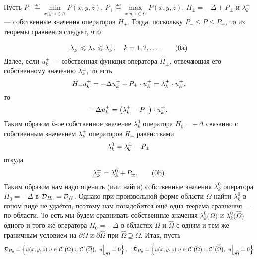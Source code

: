 Пусть $\displaystyle P_{-}\eqdef\min\limits_{x,y,z\in\overline{\Omega}}P(x,y,z)$, $\displaystyle P_{+}\eqdef\max\limits_{x,y,z\in\overline{\Omega}}P(x,y,z)$, $\displaystyle H_{\pm}=-\Delta+ P_{\pm}$  и $\lambda_k^{\pm}$ --- собственные значения операторов $H_{\pm}$. Тогда, поскольку $P_{-}\leqslant P\leqslant P_{+}$, то из теоремы сравнения следует, что%
\addtocounter{equation}{1} 
\begin{equation}\label{l10:eq:12a}
	\hfill\lambda_k^{-}\leqslant\lambda_k\leqslant\lambda_k^{+},\quad k=1,2,\ldots.\tag{\theequation a}\hfill
\end{equation} 
Далее, если $u_k^{\pm}$ --- собственная функция оператора $H_{\pm}$, отвечающая его собственному значению $\lambda_k^{\pm}$, то есть
\begin{equation*}
	\hfill H_{\pm}u_k^{\pm}=-\Delta u_k^{\pm}+P_{\pm}\cdot u_k^{\pm}=\lambda_k^{\pm}\cdot u_k^{\pm},\hfill
\end{equation*}
то
\begin{equation*}
	\hfill-\Delta u_k^{\pm}=\left(\lambda_k^{\pm}-P_{\pm}\right)\cdot u_k^{\pm}.\hfill
\end{equation*}
Таким образом $k$-ое собственное значение $\lambda_k^0$ оператора $H_0=-\Delta$ связанно с собственным значением $\lambda_k^{\pm}$ операторов $H_{\pm}$ равенствами
\begin{equation*}
	\hfill\lambda_k^0=\lambda_k^{\pm}-P_{\pm}\hfill
\end{equation*}
откуда
\begin{equation}\label{l10:eq:12b}
	\hfill\lambda_k^{\pm}=\lambda_k^0+P_{\pm}.\tag{\theequation b}\hfill
\end{equation}
Таким образом нам надо оценить (или найти) собственные значения $\lambda_k^0$ оператора $H_0=-\Delta$ в $\mathcal{D}_{H_0}=\mathcal{D}_H$. Однако при произвольной форме области $\Omega$ найти $\lambda_k^0$ в явном виде не удаётся, поэтому нам понадобится ещё одна теорема сравнения --- по области. То есть мы будем сравнивать собственные значения $\lambda_k^0\big(\Omega\big)$ и $\lambda_k^0\big(\widehat{\Omega}\big)$ одного и того же оператора $H_0=-\Delta$ в областях $\Omega$ и $\widehat{\Omega}$ с одним и тем же граничным условием на $\partial\Omega$ и $\partial\widehat{\Omega}$ при $\widehat{\Omega}\supseteq\Omega$. Итак, пусть
\begin{equation*}
	\hfill\mc{D}_{H_0}=\left\{u(x,y,z)|u\in\Cfn{2}\big(\Omega\big)\cup\Cfn{1}\big(\overline{\Omega}\big),\ u\Big|_{\partial\Omega}=0\right\},\quad\widehat{\mc{D}}_{H_0}=\left\{u(x,y,z)|u\in\Cfn{2}\big(\widehat{\Omega}\big)\cup\Cfn{1}\big(\overline{\widehat{\Omega}}\big),\ u\Big|_{\partial\widehat{\Omega}}=0\right\}
\end{equation*}  

